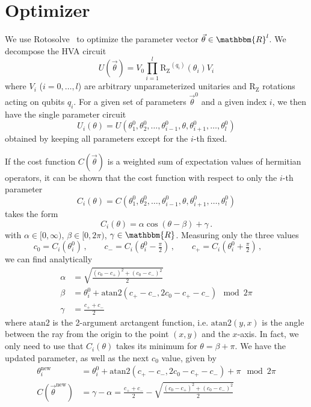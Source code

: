 \documentclass[a4paper,12pt]{article}
\newcommand{\R}{\mathbbm{R}}
\newcommand{\rz}{\mathrm{R_Z}}
\begin{document}
\section{Optimizer}
We use Rotosolve~\cite{nakanishiSequentialMinimalOptimization2020,ostaszewskiStructureOptimizationParameterized2021} to optimize the parameter vector $\vec\theta \in \R^l$. We decompose the HVA circuit
\begin{equation}
 U(\vec\theta) = V_0 \prod_{i=1}^l \rz^{(q_i)}(\theta_i) V_i
\end{equation}
where $V_i$ ($i=0,\dots,l$) are arbitrary unparameterized unitaries and $\rz$ rotations acting on qubits $q_i$. For a given set of parameters $\vec\theta^0$ and a given index $i$, we then have the single parameter circuit
\begin{equation}
U_i(\theta) = U(\theta^0_1,\theta^0_2,\dots,\theta^0_{i-1},\theta,\theta^0_{i+1},\dots,\theta^0_l)
\end{equation}
obtained by keeping all parameters except for the $i$-th fixed.

If the cost function $C(\vec\theta)$ is a weighted sum of expectation values of hermitian operators, it can be shown that the cost function with respect to only the $i$-th parameter
\begin{equation}
C_i(\theta) = C(\theta^0_1,\theta^0_2,\dots,\theta^0_{i-1},\theta,\theta^0_{i+1},\dots,\theta^0_l)
\end{equation}
takes the form
\begin{equation}
C_i(\theta) = \alpha \cos(\theta - \beta) + \gamma \,.
\end{equation}
with $\alpha \in [0,\infty)$, $\beta \in [0,2\pi)$, $\gamma \in \R$.
Measuring only the three values
\begin{equation}
c_0 = C_i(\theta^0_i) \,,\qquad
c_- = C_i(\theta^0_i - \tfrac\pi2) \,,\qquad
c_+ = C_i(\theta^0_i + \tfrac\pi2) \,,\qquad
\end{equation}
we can find analytically
\begin{align}
\alpha &= \sqrt{\frac{(c_0 - c_+)^2 + (c_0 - c_-)^2}{2}} \\
\beta &= \theta^0_i + \mathrm{atan2}(c_+ - c_-, 2 c_0 - c_+ - c_-) \mod 2 \pi \\
\gamma &= \frac{c_+ + c_-}{2}
\end{align}
where $\mathrm{atan2}$ is the 2-argument arctangent function, i.e. $\mathrm{atan2}(y,x)$ is the angle between the ray from the origin to the point $(x,y)$ and the $x$-axis. In fact, we only need to use that $C_i(\theta)$ takes its minimum for $\theta = \beta + \pi$. We have the updated parameter, as well as the next $c_0$ value, given by
\begin{align}
\theta_i^\text{new} &= \theta^0_i + \mathrm{atan2}(c_+ - c_-, 2 c_0 - c_+ - c_-) + \pi \mod 2 \pi \\
C(\vec\theta^\text{new}) &= \gamma - \alpha
= \frac{c_+ + c_-}{2} - \sqrt{\frac{(c_0 - c_+)^2 + (c_0 - c_-)^2}{2}}
\end{align}
\end{document}
